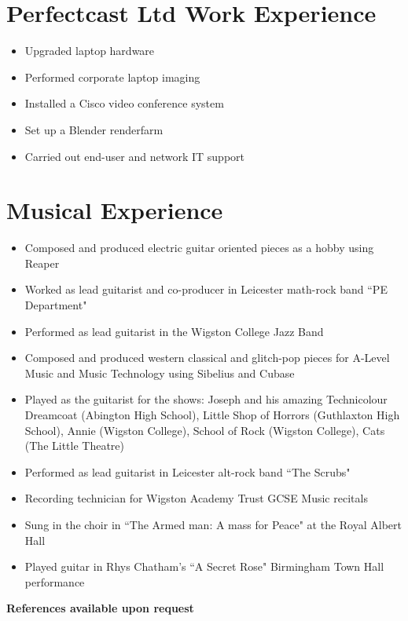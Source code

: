 \documentclass{article}
\begin{document}
\section{Perfectcast Ltd Work Experience}


\begin{itemize}[noitemsep]

\renewcommand{\labelitemi}{$\square$}
\item Upgraded laptop hardware
\item Performed corporate laptop imaging
\item Installed a Cisco video conference system 
\item Set up a Blender renderfarm
\item Carried out end-user and network IT support

\end{itemize}

\section{Musical Experience}
\begin{itemize}[noitemsep]

\renewcommand{\labelitemi}{$\square$}

\item Composed and produced electric guitar oriented pieces as a hobby using Reaper
\item Worked as lead guitarist and co-producer in Leicester math-rock band ``PE Department"
\item Performed as lead guitarist in the Wigston College Jazz Band
\item Composed and produced western classical and glitch-pop pieces for A-Level Music and Music Technology using Sibelius and Cubase
\item Played as the guitarist for the shows: Joseph and his amazing Technicolour Dreamcoat (Abington High School), Little Shop of Horrors (Guthlaxton High School), Annie (Wigston College), School of Rock (Wigston College), Cats (The Little Theatre)
\item Performed as lead guitarist in Leicester alt-rock band ``The Scrubs"
\item Recording technician for Wigston Academy Trust GCSE Music recitals
\item Sung in the choir in ``The Armed man: A mass for Peace" at the Royal Albert Hall
\item Played guitar in Rhys Chatham's ``A Secret Rose" Birmingham Town Hall performance


\end{itemize}


\begin{center}

\vskip 0.5cm
\textbf{References available upon request}

\end{center}
\end{document}
